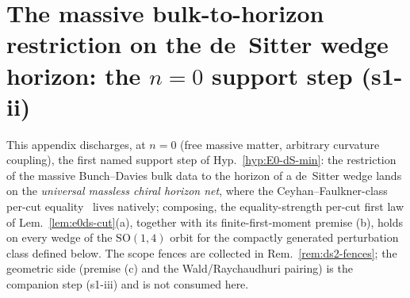 
\renewcommand{\thesection}{dS1}%
\section{The massive bulk-to-horizon restriction on the de~Sitter
  wedge horizon: the $n{=}0$ support step (s1-ii)}
\label{app:ds2-restriction}

This appendix discharges, at $n=0$ (free massive matter, arbitrary
curvature coupling), the first named support step of
Hyp.~\ref{hyp:E0-dS-min}: the restriction of the massive
Bunch--Davies bulk data to the horizon of a de~Sitter wedge lands on
the \emph{universal massless chiral horizon net}, where the
Ceyhan--Faulkner-class per-cut equality~\cite{CeyhanFaulkner2018}
lives natively; composing, the equality-strength per-cut first law of
Lem.~\ref{lem:e0ds-cut}(a), together with its finite-first-moment
premise (b), holds on every wedge of the $\mathrm{SO}(1,4)$ orbit for
the compactly generated perturbation class defined below. The scope
fences are collected in Rem.~\ref{rem:ds2-fences}; the geometric side
(premise (c) and the Wald/Raychaudhuri pairing) is the companion step
(s1-iii) and is not consumed here.

